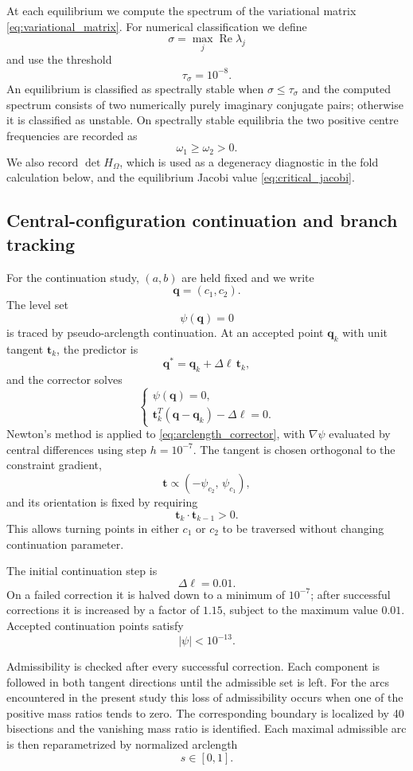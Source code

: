 At each equilibrium we compute the spectrum of the variational matrix
\eqref{eq:variational_matrix}. For numerical classification we define
\[
\sigma=\max_j \operatorname{Re}\lambda_j
\]
and use the threshold
\[
\tau_\sigma=10^{-8}.
\]
An equilibrium is classified as spectrally stable when
$\sigma\leq\tau_\sigma$ and the computed spectrum consists of two
numerically purely imaginary conjugate pairs; otherwise it is classified
as unstable. On spectrally stable equilibria the two positive centre
frequencies are recorded as
\[
\omega_1\geq\omega_2>0.
\]
We also record $\det H_\Omega$, which is used as a degeneracy diagnostic in
the fold calculation below, and the equilibrium Jacobi value
\eqref{eq:critical_jacobi}.


\subsection{Central-configuration continuation and branch tracking}
\label{subsec:continuation}

For the continuation study, $(a,b)$ are held fixed and we write
\[
\mathbf q=(c_1,c_2).
\]
The level set
\[
\psi(\mathbf q)=0
\]
is traced by pseudo-arclength continuation. At an accepted point
$\mathbf q_k$ with unit tangent $\mathbf t_k$, the predictor is
\[
\mathbf q^\ast
=
\mathbf q_k+\Delta\ell\,\mathbf t_k,
\]
and the corrector solves
\begin{equation}
\begin{cases}
\psi(\mathbf q)=0,\\[2mm]
\mathbf t_k^{T}(\mathbf q-\mathbf q_k)-\Delta\ell=0.
\end{cases}
\label{eq:arclength_corrector}
\end{equation}
Newton's method is applied to
\eqref{eq:arclength_corrector}, with
$\nabla\psi$ evaluated by central differences using step
$h=10^{-7}$. The tangent is chosen orthogonal to the constraint gradient,
\[
\mathbf t
\propto
\left(-\psi_{c_2},\,\psi_{c_1}\right),
\]
and its orientation is fixed by requiring
\[
\mathbf t_k\cdot\mathbf t_{k-1}>0.
\]
This allows turning points in either $c_1$ or $c_2$ to be traversed without
changing continuation parameter.

The initial continuation step is
\[
\Delta\ell=0.01.
\]
On a failed correction it is halved down to a minimum of $10^{-7}$; after
successful corrections it is increased by a factor of $1.15$, subject to
the maximum value $0.01$. Accepted continuation points satisfy
\[
|\psi|<10^{-13}.
\]

Admissibility is checked after every successful correction. Each component
is followed in both tangent directions until the admissible set is left.
For the arcs encountered in the present study this loss of admissibility
occurs when one of the positive mass ratios tends to zero. The corresponding
boundary is localized by 40 bisections and the vanishing mass ratio is
identified. Each maximal admissible arc is then reparametrized by normalized
arclength
\[
s\in[0,1].
\]

